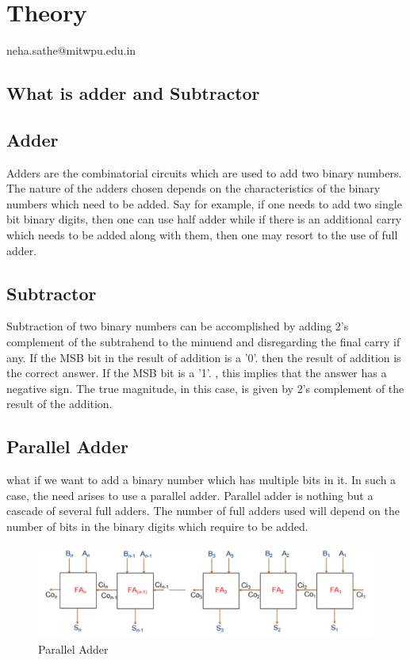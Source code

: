 \documentclass[11pt]{article}
\begin{document}
\section{Theory}neha.sathe@mitwpu.edu.in
\subsection{What is adder and Subtractor}
\subsection{Adder}
Adders are the combinatorial circuits which are used to add two binary numbers. The nature of the adders chosen depends on the characteristics of the binary numbers which need to be added. Say for example, if one needs to add two single bit binary digits, then one can use half adder while if there is an additional carry which needs to be added along with them, then one may resort to the use of full adder.
\subsection{Subtractor}
Subtraction of two binary numbers can be accomplished by adding 2's complement of the subtrahend to the minuend and disregarding the final carry if any. If the MSB bit in the result of addition is a '0'. then the result of addition is the correct answer. If the MSB bit is a '1'. , this implies that the answer has a negative sign. The true magnitude, in this case, is given by 2's complement of the result of the addition.
\subsection{Parallel Adder}
what if we want to add a binary number which has multiple bits in it. In such a case, the need arises to use a parallel adder. Parallel adder is nothing but a cascade of several full adders. The number of full adders used will depend on the number of bits in the binary digits which require to be added.
\begin{figure}[H]
\centering
\includegraphics[scale=0.5]{parallel adder.png}
\caption{Parallel Adder}
\end{figure}
\end{document}
